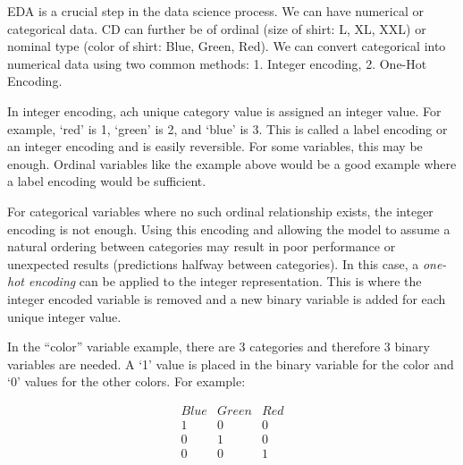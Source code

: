 \documentclass[11pt]{article}
\begin{document}
EDA is a crucial step in the data science process. We can have numerical or categorical data. 
CD can further be of ordinal (size of shirt: L, XL, XXL) or nominal type (color of shirt: Blue, Green, Red). 
We can convert categorical into numerical data using two common methods: 1. Integer encoding, 
2. One-Hot Encoding. 

In integer encoding, ach unique category value is assigned an integer value.
For example, `red' is 1, `green' is 2, and `blue' is 3. This is called a label encoding or an integer encoding and is 
easily reversible. For some variables, this may be enough.
Ordinal variables like the example above would be a good example where a label encoding would be sufficient.


For categorical variables where no such ordinal relationship exists, the integer encoding is not enough.
Using this encoding and allowing the model to assume a natural ordering between categories may result in poor performance 
or unexpected results (predictions halfway between categories). In this case, a \emph{one-hot encoding} 
can be applied to the integer representation. 
This is where the integer encoded variable is 
removed and a new binary variable is added for each 
unique integer value.

In the “color” variable example, 
there are 3 categories and 
therefore 3 binary variables are needed. 
A `1' value is placed in the binary variable for the color and 
`0' values for the other colors. For example:

\begin{equation}
\begin{matrix}
Blue & Green & Red\\
1 & 0 & 0 \\
0 & 1 & 0 \\
0 & 0 & 1 
\end{matrix}
\end{equation}
\end{document}
